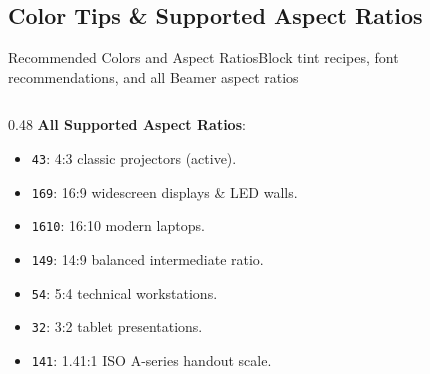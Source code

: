 \documentclass[aspectratio=43,10pt]{beamer}
\begin{document}
\subsection{Color Tips \& Supported Aspect Ratios}
\begin{frame}{Recommended Colors and Aspect Ratios}{Block tint recipes, font recommendations, and all Beamer aspect ratios}
  \footnotesize
  \begin{columns}[T]

    \begin{column}{0.48\textwidth}
      \textbf{All Supported Aspect Ratios}:
      \begin{itemize}\setlength{\itemsep}{1pt}
        \item \texttt{43}: 4:3 classic projectors (active).
        \item \texttt{169}: 16:9 widescreen displays \& LED walls.
        \item \texttt{1610}: 16:10 modern laptops.
        \item \texttt{149}: 14:9 balanced intermediate ratio.
        \item \texttt{54}: 5:4 technical workstations.
        \item \texttt{32}: 3:2 tablet presentations.
        \item \texttt{141}: 1.41:1 ISO A-series handout scale.
      \end{itemize}
    \end{column}
  \end{columns}
\end{frame}
\end{document}
